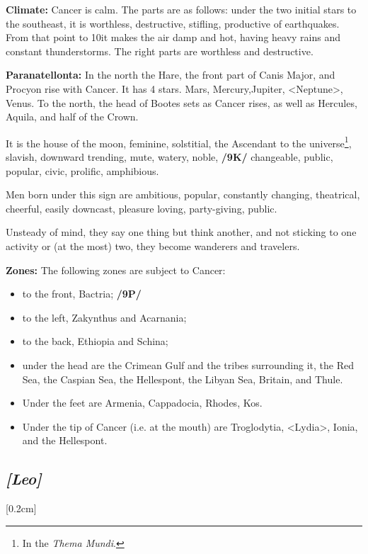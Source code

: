 \textbf{Climate:}  Cancer is calm. The parts are as follows: under the two initial stars to the southeast, it is worthless, destructive, stifling, productive of earthquakes. From that point to 10\deg it makes the air damp and hot, having heavy rains and constant thunderstorms. The right parts are worthless and destructive. 

\textbf{Paranatellonta:} In the north the Hare, the front part of Canis Major, and Procyon rise with Cancer. It has 4 stars. Mars, Mercury,Jupiter, <Neptune>, Venus. To the north, the head of Bootes sets as Cancer rises, as well as Hercules,
Aquila, and half of the Crown.

It is the house of the moon,  feminine,  solstitial, the Ascendant to the universe\footnote{In the \textit{Thema Mundi}.},  slavish, downward trending,  mute,  watery, noble, \textbf{/9K/} changeable, public, popular, civic,  prolific, amphibious. 

Men born under this sign are ambitious, popular, constantly changing, theatrical, cheerful, easily downcast, pleasure loving, party-giving, public. 

Unsteady of mind, they say one thing but think another, and not sticking to one activity or (at the most) two, they become wanderers and travelers.

\textbf{Zones:} The following zones are subject to Cancer: 
\begin{itemize}
\item to the front, Bactria; \textbf{/9P/}
\item to the left, Zakynthus and Acarnania; 
\item to the back, Ethiopia and Schina;
\item under the head are the Crimean Gulf and the tribes
surrounding it, the Red Sea, the Caspian Sea, the Hellespont, the Libyan Sea, Britain, and Thule. 
\item Under the feet are Armenia, Cappadocia, Rhodes, Kos. \item Under the tip of Cancer (i.e. at the mouth) are
Troglodytia, <Lydia>, Ionia, and the Hellespont.
\end{itemize}

\secbr
\subsection{\textit{[Leo]}}
[0.2cm]


